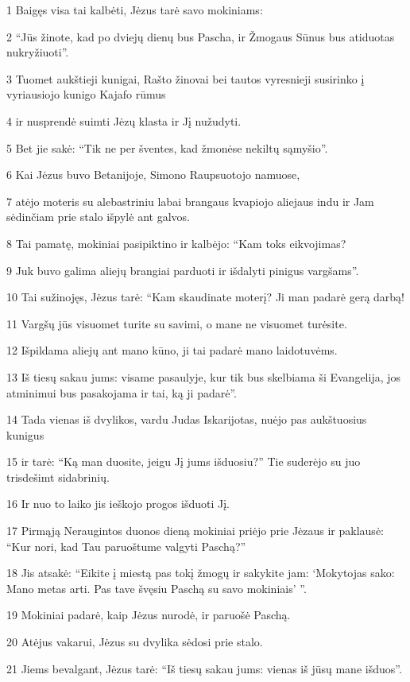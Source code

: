 \par 1 Baigęs visa tai kalbėti, Jėzus tarė savo mokiniams: 
\par 2 “Jūs žinote, kad po dviejų dienų bus Pascha, ir Žmogaus Sūnus bus atiduotas nukryžiuoti”. 
\par 3 Tuomet aukštieji kunigai, Rašto žinovai bei tautos vyresnieji susirinko į vyriausiojo kunigo Kajafo rūmus 
\par 4 ir nusprendė suimti Jėzų klasta ir Jį nužudyti. 
\par 5 Bet jie sakė: “Tik ne per šventes, kad žmonėse nekiltų sąmyšio”. 
\par 6 Kai Jėzus buvo Betanijoje, Simono Raupsuotojo namuose, 
\par 7 atėjo moteris su alebastriniu labai brangaus kvapiojo aliejaus indu ir Jam sėdinčiam prie stalo išpylė ant galvos. 
\par 8 Tai pamatę, mokiniai pasipiktino ir kalbėjo: “Kam toks eikvojimas? 
\par 9 Juk buvo galima aliejų brangiai parduoti ir išdalyti pinigus vargšams”. 
\par 10 Tai sužinojęs, Jėzus tarė: “Kam skaudinate moterį? Ji man padarė gerą darbą! 
\par 11 Vargšų jūs visuomet turite su savimi, o mane ne visuomet turėsite. 
\par 12 Išpildama aliejų ant mano kūno, ji tai padarė mano laidotuvėms. 
\par 13 Iš tiesų sakau jums: visame pasaulyje, kur tik bus skelbiama ši Evangelija, jos atminimui bus pasakojama ir tai, ką ji padarė”. 
\par 14 Tada vienas iš dvylikos, vardu Judas Iskarijotas, nuėjo pas aukštuosius kunigus 
\par 15 ir tarė: “Ką man duosite, jeigu Jį jums išduosiu?” Tie suderėjo su juo trisdešimt sidabrinių. 
\par 16 Ir nuo to laiko jis ieškojo progos išduoti Jį. 
\par 17 Pirmąją Neraugintos duonos dieną mokiniai priėjo prie Jėzaus ir paklausė: “Kur nori, kad Tau paruoštume valgyti Paschą?” 
\par 18 Jis atsakė: “Eikite į miestą pas tokį žmogų ir sakykite jam: ‘Mokytojas sako: Mano metas arti. Pas tave švęsiu Paschą su savo mokiniais’ ”. 
\par 19 Mokiniai padarė, kaip Jėzus nurodė, ir paruošė Paschą. 
\par 20 Atėjus vakarui, Jėzus su dvylika sėdosi prie stalo. 
\par 21 Jiems bevalgant, Jėzus tarė: “Iš tiesų sakau jums: vienas iš jūsų mane išduos”. 
